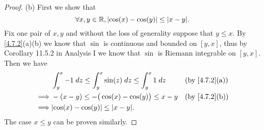 \begin{proof}{(b)}
  First we show that
  \[
    \forall x, y \in \R, \abs{\cos(x) - \cos(y)} \leq \abs{x - y}.
  \]
  Fix one pair of \(x, y\) and without the loss of generality suppose that \(y \leq x\).
  By \cref{4.7.2}(a)(b) we know that \(\sin\) is continuous and bounded on \([y, x]\), thus by Corollary 11.5.2 in Analysis I we know that \(\sin\) is Riemann integrable on \([y, x]\).
  Then we have
  \begin{align*}
             & \int_y^x -1 \; dz \leq \int_y^x \sin(z) \; dz \leq \int_y^x 1 \; dz &  & \text{(by \cref{4.7.2}(a))} \\
    \implies & -(x - y) \leq -\big(\cos(x) - \cos(y)\big) \leq x - y               &  & \text{(by \cref{4.7.2}(b))} \\
    \implies & \abs{\cos(x) - \cos(y)} \leq \abs{x - y}.
  \end{align*}
  The case \(x \leq y\) can be proven similarly.


\end{proof}
